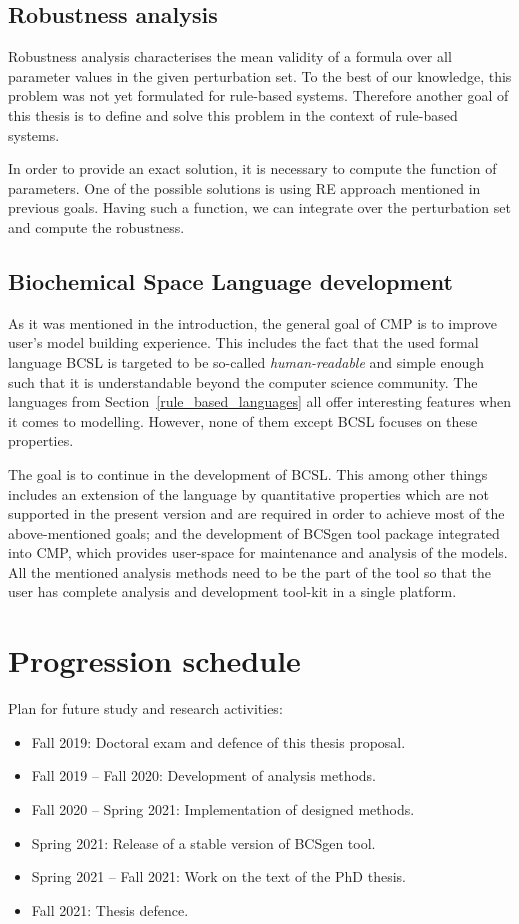 \documentclass[11pt,a4paper]{report}
\begin{document}
\subsection{Robustness analysis}

Robustness analysis characterises the mean validity of a formula over all parameter values in the given perturbation set. To the best of our knowledge, this problem was not yet formulated for rule-based systems. Therefore another goal of this thesis is to define and solve this problem in the context of rule-based systems. 

In order to provide an exact solution, it is necessary to compute the function of parameters. One of the possible solutions is using RE approach mentioned in previous goals. Having such a function, we can integrate over the perturbation set and compute the robustness.

\subsection{Biochemical Space Language development}

As it was mentioned in the introduction, the general goal of CMP is to improve user's model building experience. This includes the fact that the used formal language BCSL is targeted to be so-called \emph{human-readable} and simple enough such that it is understandable beyond the computer science community. The languages from Section~\ref{rule_based_languages} all offer interesting features when it comes to modelling. However, none of them except BCSL focuses on these properties.

The goal is to continue in the development of BCSL. This among other things includes an extension of the language by quantitative properties which are not supported in the present version and are required in order to achieve most of the above-mentioned goals; and the development of BCSgen tool package integrated into CMP, which provides user-space for maintenance and analysis of the models. All the mentioned analysis methods need to be the part of the tool so that the user has complete analysis and development tool-kit in a single platform.

\section{Progression schedule}

Plan for future study and research activities:

\begin{itemize}
\item Fall 2019: Doctoral exam and defence of this thesis proposal.
\item Fall 2019 -- Fall 2020: Development of analysis methods.
\item Fall 2020 -- Spring 2021: Implementation of designed methods.
\item Spring 2021: Release of a stable version of BCSgen tool.
\item Spring 2021 -- Fall 2021: Work on the text of the PhD thesis.
\item Fall 2021: Thesis defence.
\end{itemize}
\end{document}
